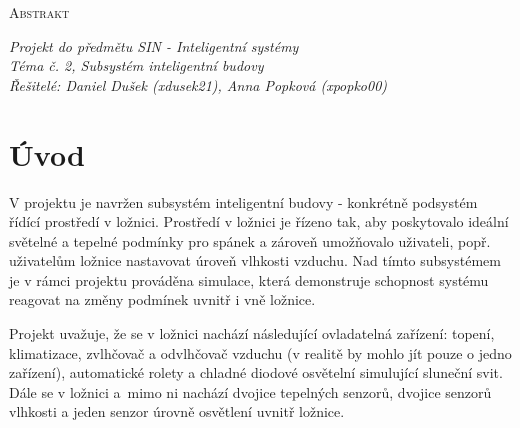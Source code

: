 \documentclass[a4paper,12pt]{article}
\renewcommand{\baselinestretch}{1.2}
\begin{document}
	

	\setlength{\parindent}{0pt}
	\vspace*{10pt}
	\LARGE \textsc{Abstrakt}
	\normalsize

	\vspace*{5pt}
	\textit{Projekt do předmětu SIN - Inteligentní systémy} \\
	\textit{Téma č. 2, Subsystém inteligentní budovy} \\
	\textit{Řešitelé: Daniel Dušek (xdusek21), Anna Popková (xpopko00)}

	\setlength{\parindent}{15pt}
	\setlength{\parskip}{15pt}
	\renewcommand{\baselinestretch}{1.5}
	\vspace*{15pt}
	
	\section{Úvod}

    V projektu je navržen subsystém inteligentní budovy - konkrétně podsystém řídící prostředí v ložnici. Prostředí v ložnici je řízeno tak, aby poskytovalo ideální světelné a tepelné podmínky pro spánek a zároveň umožňovalo uživateli, popř. uživatelům ložnice nastavovat úroveň vlhkosti vzduchu. Nad tímto subsystémem je v rámci projektu prováděna simulace, která demonstruje schopnost systému reagovat na změny podmínek uvnitř i vně ložnice. 

    Projekt uvažuje, že se v ložnici nachází následující ovladatelná zařízení: topení, klimatizace, zvlhčovač a odvlhčovač vzduchu (v realitě by mohlo jít pouze o jedno zařízení), automatické rolety a chladné diodové osvětelní simulující sluneční svit. Dále se v ložnici a~mimo ni nachází dvojice tepelných senzorů, dvojice senzorů vlhkosti a jeden senzor úrovně osvětlení uvnitř ložnice.
\end{document}
